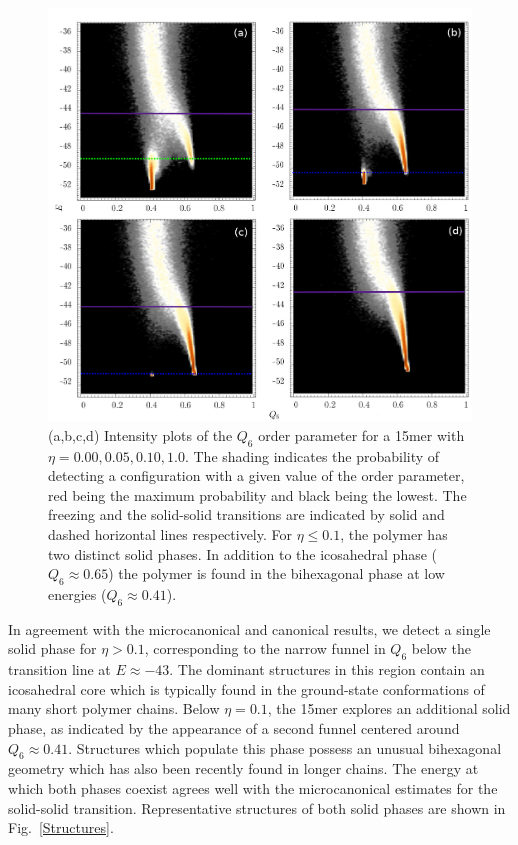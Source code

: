 \documentclass[12pt]{report}
\begin{document}
\begin{figure}
\begin{center}
	\includegraphics[trim = 0 0 0 0, clip,width=\textwidth,height=0.9
	\textwidth]{chapter6Figs/structural_analysis.eps}
\end{center}
\caption{\label{intensity_plots}(a,b,c,d) Intensity plots of the
$Q_{6}$ order parameter for a 15mer with $\eta = 0.00, 0.05, 0.10, 1.0$.
The shading indicates the probability of detecting a configuration with a
given value of the order parameter, red being the maximum probability and
black being the lowest. The freezing and the solid-solid transitions are
indicated by solid and dashed horizontal lines respectively. For $\eta \leq
0.1$, the polymer has two distinct solid phases.  In addition to the
icosahedral phase ($Q_{6} \approx 0.65$) the polymer is found in the
bihexagonal phase at low energies ($Q_{6} \approx 0.41$).}
\end{figure}
%
In agreement with the microcanonical and canonical results, we detect
a single solid phase for $\eta > 0.1$, corresponding to the narrow funnel
in $Q_{6}$ below the transition line at $E \approx -43$. The dominant
structures in this region contain an icosahedral core which is typically
found in the ground-state conformations of many short polymer chains.
Below $\eta = 0.1$, the 15mer explores an additional solid phase, as
indicated by the appearance of a second funnel centered around $Q_{6}
\approx 0.41$. Structures which populate this phase possess an unusual
bihexagonal geometry which has also been recently found in longer chains.
The energy at which both phases coexist agrees well with the microcanonical
estimates for the solid-solid transition. Representative structures of both
solid phases are shown in Fig.~\ref{Structures}.
\end{document}
